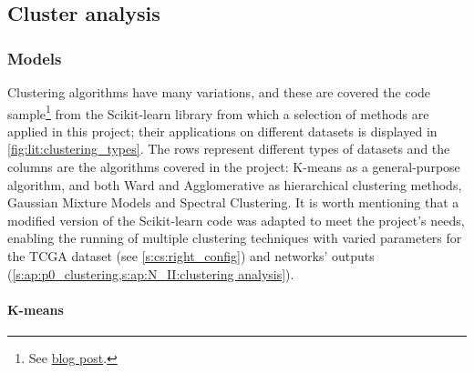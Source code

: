 \subsection{Cluster analysis} \label{s:lit:clustering}

\subsubsection*{Models} \label{s:lit:cs_models}

Clustering algorithms have many variations, and these are covered the code sample\footnote{See \href{https://scikit-learn.org/stable/modules/clustering.html}{blog post}.} from the Scikit-learn library \citep{Pedregosa2011-ts} from which a selection of methods are applied in this project; their applications on different datasets is displayed in \cref{fig:lit:clustering_types}. The rows represent different types of datasets and the columns are the algorithms covered in the project: K-means as a general-purpose algorithm, and both Ward and Agglomerative as hierarchical clustering methods, Gaussian Mixture Models and Spectral Clustering. It is worth mentioning that a modified version of the Scikit-learn code was adapted to meet the project's needs, enabling the running of multiple clustering techniques with varied parameters for the TCGA dataset (see \cref{s:cs:right_config}) and networks' outputs (\cref{s:ap:p0_clustering,s:ap:N_II:clustering analysis}).

\paragraph*{K-means}

